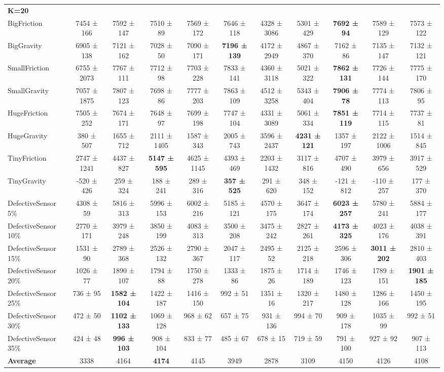 \scriptsize
\begin{tabular}{l|c|ccc|ccc|ccc} \\
\textbf{K=20} & & & & & & & & & & \\
BigFriction &7454 ± 166 &7592 ± 147 &7510 ± 89 &7569 ± 172 &7646 ± 118 &4328 ± 3086 &5301 ± 429 &\textbf{7692 ± 94} &7589 ± 129 &7573 ± 122 \\
BigGravity &6905 ± 138 &7121 ± 162 &7028 ± 50 &7090 ± 171 &\textbf{7196 ± 139} &4172 ± 2949 &4867 ± 370 &7162 ± 86 &7135 ± 147 &7132 ± 121 \\
SmallFriction &6755 ± 2073 &7767 ± 111 &7712 ± 98 &7703 ± 228 &7833 ± 141 &4360 ± 3118 &5021 ± 322 &\textbf{7862 ± 131} &7726 ± 144 &7775 ± 170 \\
SmallGravity &7057 ± 1875 &7807 ± 123 &7698 ± 86 &7777 ± 203 &7863 ± 109 &4512 ± 3258 &5343 ± 404 &\textbf{7906 ± 78} &7774 ± 113 &7806 ± 95 \\
HugeFriction &7505 ± 252 &7674 ± 171 &7648 ± 97 &7699 ± 198 &7747 ± 104 &4331 ± 3089 &5061 ± 334 &\textbf{7851 ± 119} &7714 ± 115 &7737 ± 81 \\
HugeGravity &380 ± 507 &1655 ± 712 &2111 ± 1405 &1587 ± 343 &2005 ± 743 &3596 ± 2437 &\textbf{4231 ± 121} &1357 ± 197 &2122 ± 1006 &1514 ± 845 \\
TinyFriction &2747 ± 1241 &4437 ± 827 &\textbf{5147 ± 595} &4625 ± 1145 &4393 ± 469 &2203 ± 1432 &3117 ± 816 &4707 ± 490 &3979 ± 656 &3917 ± 529 \\
TinyGravity &-520 ± 426 &259 ± 324 &188 ± 241 &289 ± 316 &\textbf{357 ± 525} &291 ± 620 &348 ± 152 &-121 ± 812 &-110 ± 257 &177 ± 370 \\
DefectiveSensor 5\% &4308 ± 59 &5816 ± 313 &5996 ± 153 &6002 ± 216 &5185 ± 121 &4570 ± 175 &3647 ± 174 &\textbf{6023 ± 257} &5780 ± 241 &5884 ± 177 \\
DefectiveSensor 10\% &2770 ± 171 &3979 ± 248 &3850 ± 199 &4083 ± 313 &3500 ± 208 &3475 ± 242 &2827 ± 261 &\textbf{4173 ± 325} &4023 ± 176 &4038 ± 391 \\
DefectiveSensor 15\% &1531 ± 90 &2789 ± 368 &2526 ± 132 &2790 ± 367 &2047 ± 117 &2495 ± 52 &2125 ± 218 &2596 ± 306 &\textbf{3011 ± 202} &2810 ± 403 \\
DefectiveSensor 20\% &1026 ± 77 &1890 ± 107 &1794 ± 88 &1750 ± 278 &1333 ± 86 &1875 ± 26 &1714 ± 189 &1746 ± 123 &1789 ± 151 &\textbf{1901 ± 185} \\
DefectiveSensor 25\% &736 ± 95 &\textbf{1582 ± 104} &1422 ± 187 &1416 ± 150 &992 ± 51 &1351 ± 16 &1320 ± 217 &1480 ± 128 &1286 ± 166 &1450 ± 195 \\
DefectiveSensor 30\% &472 ± 50 &\textbf{1102 ± 133} &1069 ± 128 &968 ± 62 &657 ± 75 &931 ± 136 &994 ± 70 &909 ± 178 &1035 ± 99 &992 ± 51 \\
DefectiveSensor 35\% &424 ± 48 &\textbf{996 ± 103} &908 ± 104 &833 ± 77 &485 ± 67 &678 ± 15 &719 ± 59 &791 ± 100 &927 ± 92 &907 ± 113 \\
\bottomrule
\textbf{Average} &3338 &4164 &\textbf{4174} &4145 &3949 &2878 &3109 &4150 &4126 &4108 \\
\bottomrule
\end{tabular}